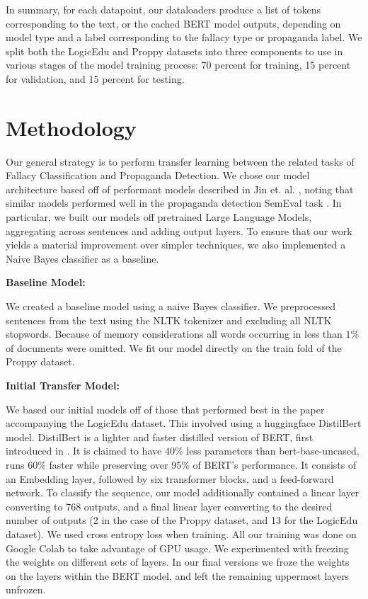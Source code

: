 \documentclass[conference]{IEEEtran}
\begin{document}
In summary, for each datapoint, our dataloaders produce a list of tokens corresponding to the text, or the cached BERT model outputs, depending on model type and a label corresponding to the fallacy type or propaganda label. We split both the LogicEdu and Proppy datasets into three components to use in various stages of the model training process: 70 percent for training, 15 percent for validation, and 15 percent for testing.



\section{Methodology}

Our general strategy is to perform transfer learning between the related tasks of Fallacy Classification and Propaganda Detection. We chose our model architecture based off of performant models described in Jin et. al. \cite{jin2022logical}, noting that similar models performed well in the propaganda detection SemEval task \cite{2020-semeval-task-11}. In particular, we built our models off pretrained Large Language Models, aggregating across sentences and adding output layers. To ensure that our work yields a material improvement over simpler techniques, we also implemented a Naive Bayes classifier as a baseline.

\textbf{Baseline Model:} 

We created a baseline model using a naive Bayes classifier. We preprocessed sentences from the text using the NLTK tokenizer and excluding all NLTK stopwords. Because of memory considerations all words occurring in less than $1\%$ of documents were omitted. We fit our model directly on the train fold of the Proppy dataset. 

\textbf{Initial Transfer Model:} 

We based our initial models off of those that performed best in the paper accompanying the LogicEdu dataset. This involved using a huggingface DistilBert model. DistilBert is a lighter and faster distilled version of BERT, first introduced in \cite{sanh2019distilbert}. It is claimed to have 40$\%$ less parameters than bert-base-uncased, runs 60\% faster while preserving over 95\% of BERT’s performance. It consists of an Embedding layer, followed by six transformer blocks, and a feed-forward network.
To classify the sequence, our model additionally contained a linear layer converting to 768 outputs, and a final linear layer converting to the desired number of outputs (2 in the case of the Proppy dataset, and 13 for the LogicEdu dataset). We used cross entropy loss when training. All our training was done on Google Colab to take advantage of GPU usage.
We experimented with freezing the weights on different sets of layers. In our final versions we froze the weights on the layers within the BERT model, and left the remaining uppermost layers unfrozen. 
\end{document}
